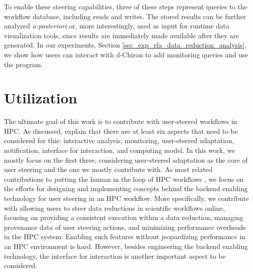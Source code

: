 


To enable these steering capabilities, three of these steps
represent queries to the workflow database, including reads and writes. The
stored results can be further analyzed \emph{a-posteriori} or, more
interestingly, used as input for runtime data visualization tools, since
results are immediately made available after they are generated. In our experiments, Section \ref{sec_exp_rfa_data_reduction_analysis}, we show how users can interact with d-Chiron to add
monitoring queries and use the  program.


\section{Utilization}
\label{dchiron-utilization}

The ultimate goal of this work is to contribute with user-steered
workflows in HPC. As discussed, \citet{Mattoso2015Dynamic} explain that there are at least
six aspects that need to be considered for this: interactive analysis,
monitoring, user-steered adaptation, notification, interface for interaction,
and computing model.
In this work, we mostly focus on the
first three, considering user-steered adaptation as the core of user
steering and the one we mostly contribute with. As most related
contributions to putting the human in the loop of HPC workflows \cite{Nguyen2015WorkWays:,Mattoso2015Dynamic,Dias2015Data-centric}, we focus on the efforts for designing and implementing concepts behind the backend
enabling technology for user steering in an HPC workflow.
More
specifically, we contribute with allowing users to steer data
reductions in scientific workflows online, focusing on providing a
consistent execution within a data reduction, managing provenance data
of user steering actions, and minimizing performance overheads in the
HPC system. Enabling such features without
jeopardizing performance in an HPC environment is hard.
However, besides engineering the backend enabling technology, the
interface for interaction is another important aspect to be considered.

